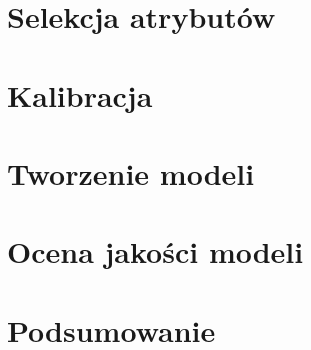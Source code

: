\documentclass{article}
\begin{document}
\section{Selekcja atrybutów}
\section{Kalibracja}
\section{Tworzenie modeli}
\section{Ocena jakości modeli}
\section{Podsumowanie}
\end{document}
